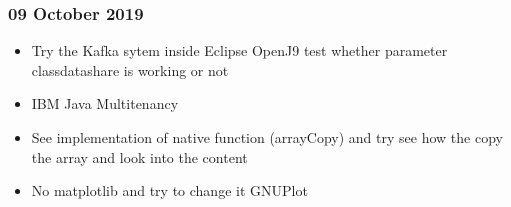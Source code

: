 \subsubsection{09 October 2019}

\begin{itemize}
\item Try the Kafka sytem inside Eclipse OpenJ9 test whether parameter classdatashare is working or not
\item IBM Java Multitenancy
\item See implementation of native function (arrayCopy) and try see how the copy the array and look into the content
\item No matplotlib and try to change it GNUPlot
\end{itemize}